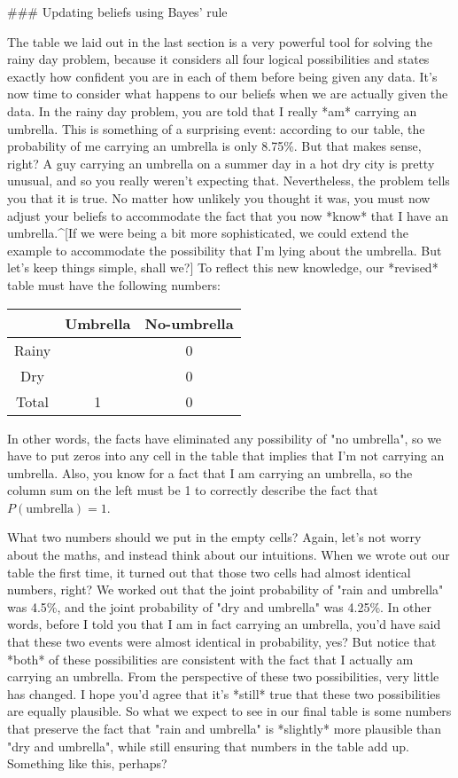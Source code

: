 ### Updating beliefs using Bayes' rule

The table we laid out in the last section is a very powerful tool for solving the rainy day problem, because it considers all four logical possibilities and states exactly how confident you are in each of them before being given any data. It's now time to consider what happens to our beliefs when we are actually given the data. In the rainy day problem, you are told that I really *am* carrying an umbrella. This is something of a surprising event: according to our table, the probability of me carrying an umbrella is only 8.75\%. But that makes sense, right? A guy carrying an umbrella on a summer day in a hot dry city is pretty unusual, and so you really weren't expecting that. Nevertheless, the problem tells you that it is true. No matter how unlikely you thought it was, you must now adjust your beliefs to accommodate the fact that you now *know* that I have an umbrella.^[If we were being a bit more sophisticated, we could extend the example to accommodate the possibility that I'm lying about the umbrella. But let's keep things simple, shall we?] To reflect this new knowledge, our *revised* table must have the following numbers:

\begin{center}
\begin{tabular}{c|cc}
& Umbrella & No-umbrella  \\ \hline
Rainy &  & 0   \\
Dry &  & 0    \\ \hline
Total & 1 & 0 
\end{tabular}
\end{center}


In other words, the facts have eliminated any possibility of "no umbrella", so we have to put zeros into any cell in the table that implies that I'm not carrying an umbrella. Also, you know for a fact that I am carrying an umbrella, so the column sum on the left must be 1 to correctly describe the fact that $P(\mbox{umbrella})=1$.

What two numbers should we put in the empty cells? Again, let's not worry about the maths, and instead think about our intuitions. When we wrote out our table the first time, it turned out that those two cells had almost identical numbers, right? We worked out that the joint probability of "rain and umbrella" was 4.5\%, and the joint probability of "dry and umbrella" was 4.25\%. In other words, before I told you that I am in fact carrying an umbrella, you'd have said that these two events were almost identical in probability, yes? But notice that *both* of these possibilities are consistent with the fact that I actually am carrying an umbrella. From the perspective of these two possibilities, very little has changed. I hope you'd agree that it's *still* true that these two possibilities are equally plausible. So what we expect to see in our final table is some numbers that preserve the fact that "rain and umbrella" is *slightly* more plausible than "dry and umbrella", while still ensuring that numbers in the table add up. Something like this, perhaps?

